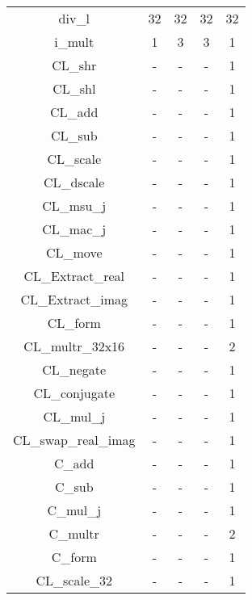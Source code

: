 \begin{longtable}{|c|c|c|c|c|}
div\_l                  & 32      & 32      & 32      & 32       \\
i\_mult                 & 1       & 3       & 3       & 1        \\
CL\_shr                 & -       & -       & -       & 1        \\
CL\_shl                 & -       & -       & -       & 1        \\
CL\_add                 & -       & -       & -       & 1        \\
CL\_sub                 & -       & -       & -       & 1        \\
CL\_scale               & -       & -       & -       & 1        \\
CL\_dscale              & -       & -       & -       & 1        \\
CL\_msu\_j              & -       & -       & -       & 1        \\
CL\_mac\_j              & -       & -       & -       & 1        \\
CL\_move                & -       & -       & -       & 1        \\
CL\_Extract\_real       & -       & -       & -       & 1        \\
CL\_Extract\_imag       & -       & -       & -       & 1        \\
CL\_form                & -       & -       & -       & 1        \\
CL\_multr\_32x16        & -       & -       & -       & 2        \\
CL\_negate              & -       & -       & -       & 1        \\
CL\_conjugate           & -       & -       & -       & 1        \\
CL\_mul\_j              & -       & -       & -       & 1        \\
CL\_swap\_real\_imag    & -       & -       & -       & 1        \\
C\_add                  & -       & -       & -       & 1        \\
C\_sub                  & -       & -       & -       & 1        \\
C\_mul\_j               & -       & -       & -       & 1        \\
C\_multr                & -       & -       & -       & 2        \\
C\_form                 & -       & -       & -       & 1        \\
CL\_scale\_32           & -       & -       & -       & 1        \\

\end{longtable}
